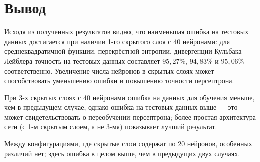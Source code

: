 \documentclass[a4paper, 14pt]{extarticle}
\begin{document}
\section{Вывод}

%
%
%

Исходя из полученных результатов видно, что наименьшая ошибка на тестовых данных достигается при наличии 1-го скрытого слоя с 40 нейронами: для
среднеквадратичной функции, перекрёстной энтропии, дивергенции Кульбака-Лейблера точность на тестовых данных составляет $95,27\%$, $94,83\%$ и $95,06\%$
соответственно. Увеличение числа нейронов в скрытых слоях может способствовать уменьшению ошибки и повышению точности персептрона.

При 3-х скрытых слоях с 40 нейронами ошибка на данных для обучения меньше, чем в предыдущем случае, однако ошибка на тестовых данных выше --- это может
свидетельствовать о переобучении персептрона; более простая архитектура сети (с 1-м скрытым слоем, а не 3-мя) показывает лучший результат.

Между конфигурациями, где скрытые слои содержат по 20 нейронов, особенных различий нет; здесь ошибка в целом выше, чем в предыдущих двух случаях.
\end{document}
